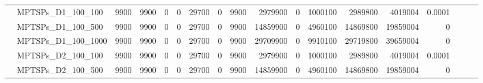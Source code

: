 \begin{landscape}
\begin{longtable}[c]{llrrrrrrrrrrrrrlll}
		& MPTSPs\_D1\_100\_100         & 9900                        & 9900                       & 0                          & 0                           & 29700                      & 0                          & 9900                       & 2979900                   & 0                         & 1000100                    & 2989800                    & 4019004                        & 0.0001                        &                          &                          &                          \\
		& MPTSPs\_D1\_100\_500         & 9900                        & 9900                       & 0                          & 0                           & 29700                      & 0                          & 9900                       & 14859900                  & 0                         & 4960100                    & 14869800                   & 19859004                       & 0                             &                          &                          &                          \\
		& MPTSPs\_D1\_100\_1000        & 9900                        & 9900                       & 0                          & 0                           & 29700                      & 0                          & 9900                       & 29709900                  & 0                         & 9910100                    & 29719800                   & 39659004                       & 0                             &                          &                          &                          \\
		& MPTSPs\_D2\_100\_100         & 9900                        & 9900                       & 0                          & 0                           & 29700                      & 0                          & 9900                       & 2979900                   & 0                         & 1000100                    & 2989800                    & 4019004                        & 0.0001                        &                          &                          &                          \\
		& MPTSPs\_D2\_100\_500         & 9900                        & 9900                       & 0                          & 0                           & 29700                      & 0                          & 9900                       & 14859900                  & 0                         & 4960100                    & 14869800                   & 19859004                       & 0                             &                          &                          &                          \\

\end{longtable}
\end{landscape}
